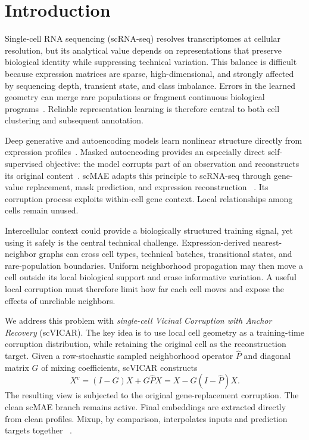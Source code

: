 \section{Introduction}
\label{sec:introduction}

Single-cell RNA sequencing (scRNA-seq) resolves transcriptomes at cellular
resolution, but its analytical value depends on representations that preserve
biological identity while suppressing technical variation. This balance is
difficult because expression matrices are sparse, high-dimensional, and
strongly affected by sequencing depth, transient state, and class imbalance.
Errors in the learned geometry can merge rare populations or fragment
continuous biological programs~\cite{kiselev2019challenges}. Reliable
representation learning is therefore central to both cell clustering and
subsequent annotation.

Deep generative and autoencoding models learn nonlinear structure directly
from expression profiles~\cite{lopez2018scvi,tian2019scdeepcluster,tian2021scdcc}.
Masked autoencoding provides an especially direct self-supervised objective:
the model corrupts part of an observation and reconstructs its original
content~\cite{he2022mae}. scMAE adapts this principle to scRNA-seq through
gene-value replacement, mask prediction, and expression reconstruction
~\cite{fang2024scmae}. Its corruption process exploits within-cell gene
context. Local relationships among cells remain unused.

Intercellular context could provide a biologically structured training signal,
yet using it safely is the central technical challenge. Expression-derived
nearest-neighbor graphs can cross cell types, technical batches, transitional
states, and rare-population boundaries. Uniform neighborhood propagation may
then move a cell outside its local biological support and erase informative
variation. A useful local corruption must therefore limit how far each cell
moves and expose the effects of unreliable neighbors.

We address this problem with \emph{single-cell Vicinal Corruption with Anchor
Recovery} (scVICAR). The key idea is to use local cell geometry as a
training-time corruption distribution, while retaining the original cell as
the reconstruction target. Given a row-stochastic sampled neighborhood
operator $\widehat P$ and diagonal matrix $G$ of mixing coefficients, scVICAR constructs
\begin{equation}
 X^v=(I-G)X+G\widehat PX=X-G(I-\widehat P)X.
 \label{eq:intro-view}
\end{equation}
The resulting view is subjected to the original gene-replacement corruption.
The clean scMAE branch remains active. Final embeddings are extracted directly
from clean profiles. Mixup, by comparison, interpolates inputs and prediction targets together
~\cite{zhang2018mixup}.

